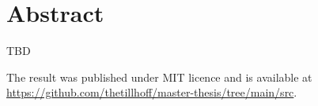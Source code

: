 \titlespacing*{\chapter}{170pt}{0pt}{10pt} %

\chapter*{Abstract}
\begin{addmargin}[2em]{2em}
TBD
\end{addmargin}

\bigskip
\begin{addmargin}[2em]{2em}
The result was published under MIT licence and is available at \\
\url{https://github.com/thetillhoff/master-thesis/tree/main/src}.
\end{addmargin}


\titlespacing*{\chapter}{0pt}{0pt}{10pt} %
